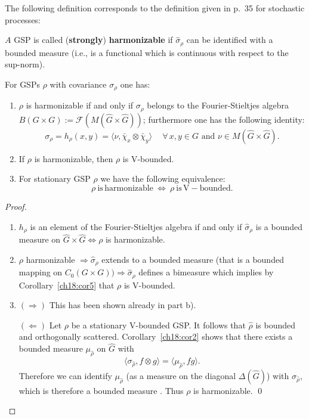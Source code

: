 \documentclass[graybox]{svmult}
\begin{document}
The following definition corresponds to the
definition given in \cite{ni75} p.~35 for stochastic processes:

\begin{definition}
\label{ch18:def9}
$A$ GSP is called (\textbf{strongly}) \textbf{harmonizable} if
$\hat{\sigma}_{\rho}$ can be identified with a bounded measure
(i.e., is a functional which is continuous with respect to
the \hbox{sup-norm}).
\end{definition}

\begin{proposition}
\label{ch18:pro13}
For GSPs  $\rho $  with covariance ${\sigma_{ \rho}}$ one has:
\begin{enumerate}
\item[(a)] $\rho $ is harmonizable if and only if
${\sigma_{ \rho}}$ belongs to the Fourier-Stieltjes
algebra $B(G\times G) := \mathcal{F}(M(\hat{G}\times \hat{G}))$;
furthermore one has the following identity:
\[
{\sigma_{ \rho}} = h_{\rho}(x,y) = \langle \nu ,\bar{\chi}_{x}
\otimes \bar{\chi }_{y}\rangle  \ \quad
\forall \,  x,y \in G\text{ and }\nu
\in  M(\hat{G}\times \hat{G}).
\]

\item[(b)] If $\rho$ is harmonizable, then  $\rho$ is V-bounded.

\item[(c)] For stationary  GSP $\rho $ we have the following equivalence:
\[
\rho\ \mathrm{is \, harmonizable}\ \Longleftrightarrow\ \rho\ \mathrm{is \,  V-bounded}.
\]
\end{enumerate}
\end{proposition}

\begin{proof}\
\begin{enumerate}
\item[(a)] $h_{\rho}$ is an element of the Fourier-Stieltjes
algebra   if and only if $\hat{\sigma }_{\rho}$ is a bounded measure on $\hat{G}\times
\hat{G} \Leftrightarrow \rho $ is  harmonizable.

\item[(b)] $\rho$ 
harmonizable $\Rightarrow \hat{\sigma}_{\rho}$ extends to a bounded
measure (that is a bounded mapping on $C_{0}(G\times G) ) \Rightarrow
\hat{\sigma}_{\rho}$ defines a  bimeasure  which
implies by Corollary~\ref{ch18:cor5} that $\rho $ is V-bounded.

\item[(c)] $(\Rightarrow )$ This has been shown already in part b).

$(\Leftarrow )$ Let $\rho $ be a stationary V-bounded GSP. It
follows that $\hat{\rho}$ is bounded and orthogonally scattered.
Corollary~\ref{ch18:cor2} shows that there exists a bounded measure $\mu_{\hat{\rho}}$ on $\hat{G}$ with
\[
\langle \sigma_{\hat{\rho}},f\otimes g\rangle = \langle \mu_{\hat{\rho}},fg\rangle.
\]
Therefore we can identify $\mu_{\hat{\rho}}$
(as a measure on the diagonal
$\varDelta (\hat{G})$) with $\sigma_{\hat{\rho}}$,
which is therefore a bounded measure .  Thus $\rho $ is
harmonizable. \qed
\end{enumerate}
\end{proof}
\end{document}
